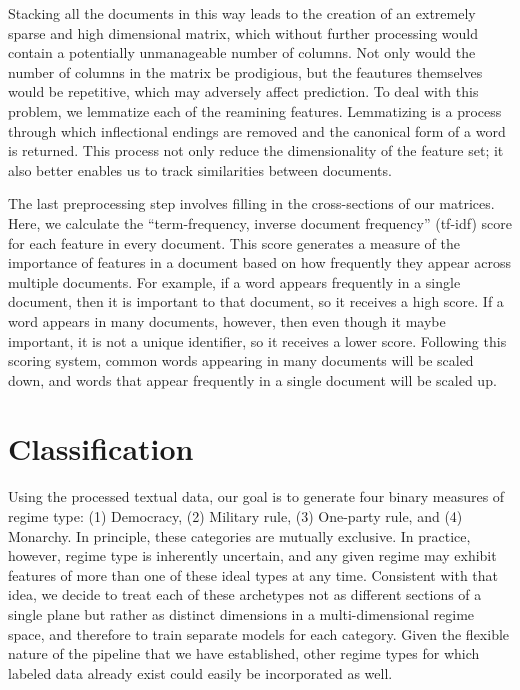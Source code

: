 \documentclass[pdftex,12pt,fullpage,oneside]{amsart}
\begin{document}
Stacking all the documents in this way leads to the creation of an extremely sparse and high dimensional matrix, which without further processing would contain a potentially unmanageable number of columns. Not only would the number of columns in the matrix be prodigious, but the feautures themselves would be repetitive, which may adversely affect prediction. To deal with this problem, we lemmatize each of the reamining features. Lemmatizing is a process through which inflectional endings are removed and the canonical form of a word is returned. This process not only reduce the dimensionality of the feature set; it also better enables us to track similarities between documents. 

The last preprocessing step involves filling in the cross-sections of our matrices. Here, we calculate the ``term-frequency, inverse document frequency'' (tf-idf) score for each feature in every document. This score generates a measure of the importance of features in a document based on how frequently they appear across multiple documents. For example, if a word appears frequently in a single document, then it is important to that document, so it receives a high score. If a word appears in many documents, however, then even though it maybe important, it is not a unique identifier, so it receives a lower score. Following this scoring system, common words appearing in many documents will be scaled down, and words that appear frequently in a single document will be scaled up.

\section{Classification}

Using the processed textual data, our goal is to generate four binary measures of regime type: (1) Democracy, (2) Military rule, (3) One-party rule, and (4) Monarchy. In principle, these categories are mutually exclusive. In practice, however, regime type is inherently uncertain, and any given regime may exhibit features of more than one of these ideal types at any time. Consistent with that idea, we decide to treat each of these archetypes not as different sections of a single plane but rather as distinct dimensions in a multi-dimensional regime space, and therefore to train separate models for each category. Given the flexible nature of the pipeline that we have established, other regime types for which labeled data already exist could easily be incorporated as well.
\end{document}
